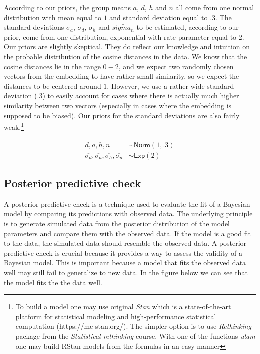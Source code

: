 \documentclass[
  12pt,
  dvipsnames,enabledeprecatedfontcommands]{scrartcl}
\begin{document}
According to our priors, the group means \(\bar{a}\), \(\bar{d}\),
\(\bar{h}\) and \(\bar{n}\) all come from one normal distribution with
mean equal to \(1\) and standard deviation equal to \(.3\). The standard
deviations \(\bar{\sigma_a}\), \(\bar{\sigma_d}\), \(\bar{\sigma_h}\)
and \(\bar{sigma_n}\) to be estimated, according to our prior, come from
one distribution, exponential with rate parameter equal to \(2\). Our
priors are slightly skeptical. They do reflect our knowledge and
intuition on the probable distribution of the cosine distances in the
data. We know that the cosine distances lie in the range \(0-2\), and we
expect two randomly chosen vectors from the embedding to have rather
small similarity, so we expect the distances to be centered around
\(1\). However, we use a rather wide standard deviation (\(.3\)) to
easily account for cases where there is actually much higher similarity
between two vectors (especially in cases where the embedding is supposed
to be biased). Our priors for the standard deviations are also fairly
weak.\footnote{To build a model one may use original \textit{Stan} which is a state-of-the-art platform for statistical modeling and high-performance statistical computation (https://mc-stan.org/). The simpler option is to use \textit{Rethinking} package from the \textit{Statistical rethinking} course. With one of the functions \textit{ulam} one may build RStan models from the formulas in an easy manner}

\begin{align*}
\bar{d}, \bar{a}, \bar{h}, \bar{n} &\sim \mathsf{Norm}(1, .3)\\ 
\overline{\sigma_d}, \overline{\sigma_a},  \overline{\sigma_h},  \overline{\sigma_n}  &\sim \mathsf{Exp}(2)
\end{align*}

\hypertarget{posterior-predictive-check}{%
\subsection{Posterior predictive
check}\label{posterior-predictive-check}}

\label{subsec:posterior}

A posterior predictive check is a technique used to evaluate the fit of
a Bayesian model by comparing its predictions with observed data. The
underlying principle is to generate simulated data from the posterior
distribution of the model parameters and compare them with the observed
data. If the model is a good fit to the data, the simulated data should
resemble the observed data. A posterior predictive check is crucial
because it provides a way to assess the validity of a Bayesian model.
This is important because a model that fits the observed data well may
still fail to generalize to new data. In the figure below we can see
that the model fits the the data well.
\end{document}
